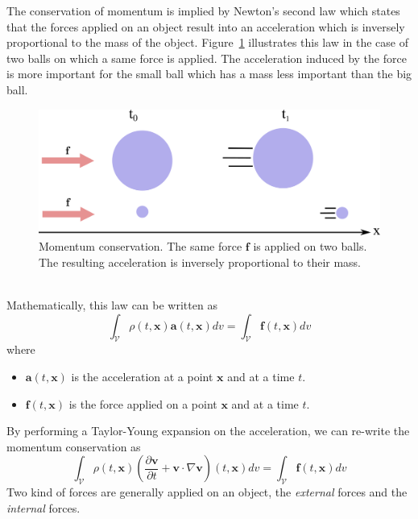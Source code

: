 The conservation of momentum is implied by Newton's second law which states that the forces applied on an object result into an acceleration which is inversely proportional to the mass of the object.
Figure~\ref{fig:momentumConservation} illustrates this law in the case of two balls on which a same force is applied.
The acceleration induced by the force is more important for the small ball which has a mass less important than the big ball.
\begin{figure}[!h]
\centering
\includegraphics[width=\linewidth]{images/continuum_mechanics/momentumConservation.png}
\caption[STAR mechanics: Momentum conservation]{\label{fig:momentumConservation} Momentum conservation. The same force $\mathbf{f}$ is applied on two balls. The resulting acceleration is inversely proportional to their mass.}
\end{figure}
\\
Mathematically, this law can be written as
\begin{equation}
\displaystyle 
\int_{\mathcal{V}} 
\rho(t,\mathbf{x})\mathbf{a}(t,\mathbf{x}) dv 
= 
\int_{\mathcal{V}} \mathbf{f}(t,\mathbf{x}) dv
\end{equation}
where
\begin{itemize}
	\item $\mathbf{a}(t,\mathbf{x})$ is the acceleration at a point $\mathbf{x}$ and at a time $t$.
		\item $\mathbf{f}(t,\mathbf{x})$ is the force applied on a point $\mathbf{x}$ and at a time $t$.
\end{itemize}
By performing a Taylor-Young expansion on the acceleration, we can re-write the momentum conservation as
\begin{equation}
\label{eq:momentumConservation}
\displaystyle 
\int_{\mathcal{V}} 
\rho(t,\mathbf{x}) \left( \frac{\partial\mathbf{v}}{\partial t} + \mathbf{v} \cdot \nabla \mathbf{v} \right)(t,\mathbf{x}) dv 
= 
\int_{\mathcal{V}} \mathbf{f}(t,\mathbf{x}) dv
\end{equation}
Two kind of forces are generally applied on an object, the \emph{external} forces and the \emph{internal} forces.
